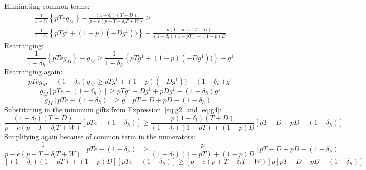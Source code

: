 \documentclass[12pt]{article}
\newcommand{\de}{\delta}
\begin{document}
Eliminating common terms:
	\begin{multline*}
		\frac{1}{1-\de_h}\left\{pTeg_M \right\} - \frac{\left(1 - \de_l \right) \left( T + D \right)}{p - e \left( p + T - \de_l T + W \right)} \geq \\
		\frac{1}{1-\de_h}\left\{pTg^1 + (1-p)(- Dg^1))\right\} - \frac{p(1-d_l)(T+D)}{(1-d_l)(1-pT)+(1-p)D}
	\end{multline*}			
Rearranging:
	\begin{equation*}
		\frac{1}{1-\de_h}\left\{pTeg_M \right\} - g_M \geq \frac{1}{1-\de_h}\left\{pTg^1 + (1-p)(- Dg^1))\right\} - g^1
	\end{equation*}		
Rearranging again:
	\begin{equation*}
		pTeg_M - \left(1-\de_h\right)g_M \geq pTg^1 + (1-p)(- Dg^1)) - \left(1-\de_h\right)g^1
	\end{equation*}	
	\begin{equation*}
		g_M\left[pTe - \left(1-\de_h\right)\right] \geq pTg^1 -Dg^1 + pDg^1 - \left(1-\de_h\right)g^1
	\end{equation*}
	\begin{equation*}
		g_M\left[pTe - \left(1-\de_h\right)\right] \geq g^1\left[pT - D + pD - \left(1-\de_h\right)\right]
	\end{equation*}	
Substituting in the minimum gifts from Expression~\ref{eq:g2} and \ref{eq:g4}:				
	\begin{equation*}
		\frac{\left(1 - \de_l \right) \left( T + D \right)}{p - e \left( p + T - \de_l T + W \right)} \left[pTe - \left(1-\de_h\right)\right] \geq \frac{p(1-\de_l)(T + D)}{\left(1-\de_l \right)(1-pT) +(1-p)D} \left[pT - D + pD - \left(1-\de_h\right)\right]
	\end{equation*}	
Simplifying again because of common term in the numerators:
	\begin{equation*}
		\frac{1}{p - e \left( p + T - \de_l T + W \right)} \left[pTe - \left(1-\de_h\right)\right] \geq \frac{p}{\left(1-\de_l \right)(1-pT) +(1-p)D} \left[pT - D + pD - \left(1-\de_h\right)\right]
	\end{equation*}	
		\begin{equation*}
		\left[\left(1-\de_l \right)(1-pT) +(1-p)D\right] \left[pTe - \left(1-\de_h\right)\right] \geq \left[p - e \left( p + T - \de_l T + W \right)\right]p \left[pT - D + pD - \left(1-\de_h\right)\right]
	\end{equation*}	
	
\end{document}
